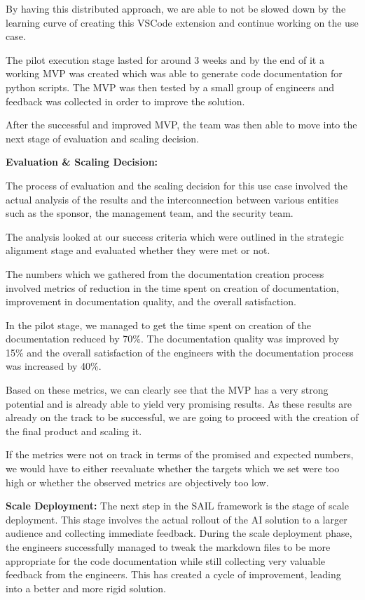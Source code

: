 \documentclass[]{imc-inf}
\begin{document}
By having this distributed approach, we are able to not be slowed down by the learning curve of creating this VSCode extension and continue working on the use case. 

The pilot execution stage lasted for around 3 weeks and by the end of it a working MVP was created which was able to generate code documentation for python scripts. The MVP was then tested by a small group of engineers and feedback was collected in order to improve the solution.

After the successful and improved MVP, the team was then able to move into the next stage of evaluation and scaling decision.

\textbf{Evaluation \& Scaling Decision:}

The process of evaluation and the scaling decision for this use case involved the actual analysis of the results and the interconnection between various entities such as the sponsor, the management team, and the security team.

The analysis looked at our success criteria which were outlined in the strategic alignment stage and evaluated whether they were met or not.

The numbers which we gathered from the documentation creation process involved metrics of reduction in the time spent on creation of documentation, improvement in documentation quality, and the overall satisfaction. 	

In the pilot stage, we managed to get the time spent on creation of the documentation reduced by 70\%.
The documentation quality was improved by 15\% and the overall satisfaction of the engineers with the documentation process was increased by 40\%.

Based on these metrics, we can clearly see that the MVP has a very strong potential and is already able to yield very promising results. 
As these results are already on the track to be successful, we are going to proceed with the creation of the final product and scaling it. 

If the metrics were not on track in terms of the promised and expected numbers, we would have to either reevaluate whether the targets which we set were too high or whether the observed metrics are objectively too low.

\textbf{Scale Deployment:}
The next step in the SAIL framework is the stage of scale deployment. This stage involves the actual rollout of the AI solution to a larger audience and collecting immediate feedback.
During the scale deployment phase, the engineers successfully managed to tweak the markdown files to be more appropriate for the code documentation while still collecting very valuable feedback from the engineers. This has created a cycle of improvement, leading into a better and more rigid solution. 
\end{document}
